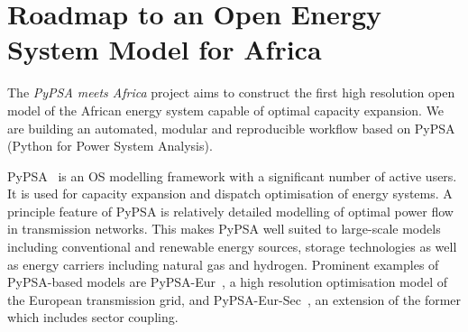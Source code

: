 \documentclass[conference, a4paper]{IEEEtran}
\begin{document}


\section{Roadmap to an Open Energy System Model for Africa}

The \emph{PyPSA meets Africa} project aims to construct the first high resolution open model of the African energy system capable of optimal capacity expansion. We are building an automated, modular and reproducible workflow based on PyPSA (Python for Power System Analysis).



PyPSA~\cite{brown-horsch-ea-2018} is an OS modelling framework with a significant number of active users.
It is used for capacity expansion and dispatch optimisation of energy systems.
A principle feature of PyPSA is relatively detailed modelling of optimal power flow in transmission networks.
This makes PyPSA well suited to large-scale models including conventional and renewable energy sources, storage technologies as well as energy carriers including natural gas and hydrogen.
Prominent examples of PyPSA-based models are PyPSA-Eur~\cite{PyPSAEur}, a high resolution optimisation model of the European transmission grid, and PyPSA-Eur-Sec~\cite{PyPSAEurSec}, an extension of the former which includes sector coupling.
\end{document}
